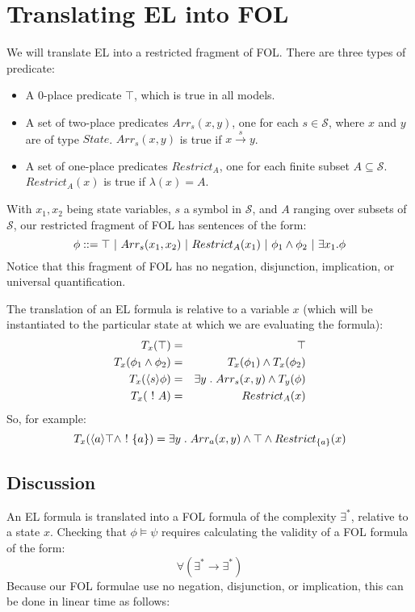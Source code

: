 \section{Translating EL into FOL}

We will translate EL into a restricted fragment of FOL.
There are three types of predicate:
\begin{itemize}
\item
A 0-place predicate $\top$, which is true in all models.
\item
A set of two-place predicates $Arr_s(x, y)$, one for each $s \in \mathcal{S}$, where $x$ and $y$ are of type $State$. $Arr_s(x, y)$ is true if $x \xrightarrow{s} y$.
\item
A set of one-place predicates $Restrict_A$, one for each finite subset $A \subseteq \mathcal{S}$. 
$Restrict_{A}(x)$ is true if $\lambda(x) = A$.
\end{itemize}
With $x_1, x_2$ being state variables, $s$ a symbol in $\mathcal{S}$, and $A$ ranging over subsets of $\mathcal{S}$, our restricted fragment of FOL has sentences of the form:
\[
\phi ::= \top \ | \  Arr_{s}(x_1, x_2)\ | \  Restrict_A(x_1) \ | \  \phi_1 \land \phi_2 \ | \  \exists x_1 . \phi 
\]
Notice that this fragment of FOL has no negation, disjunction, implication, or universal quantification.

The translation of an EL formula is relative to a variable $x$ (which will be instantiated to the particular state at which we are evaluating the formula):
\begin{eqnarray}
T_x(\top) & = & \top \nonumber \\
T_x(\phi_1 \land \phi_2) & = & T_x(\phi_1) \land T_x(\phi_2) \nonumber \\
T_x(\langle s \rangle \phi) & = & \exists y \; . \; Arr_s(x,y) \land T_y(\phi) \nonumber \\
T_x(\ ! \  A) & = & Restrict_A(x) \nonumber
\end{eqnarray}
So, for example:
\[
T_x(\langle a \rangle \top \land \ ! \  \{a\}) = \exists y \; . \; Arr_a(x,y) \land \top \land Restrict_{\{a\}}(x)
\]

\subsection{Discussion}
An EL formula is translated into a FOL formula of the complexity $\exists^*$, relative to a state $x$.
Checking that $\phi \models \psi$ requires calculating the validity of a FOL formula of the form:
\[
\forall (\exists^* \rightarrow \exists^*)
\]
Because our FOL formulae use no negation, disjunction, or implication, this can be done in linear time as follows:

